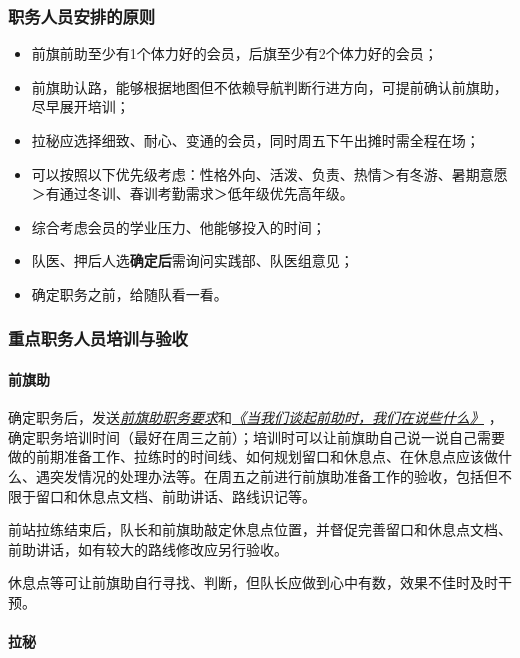 \documentclass[UTF8]{ctexart}
\begin{document}
\subsubsection{职务人员安排的原则}

\begin{itemize}[nosep,left=2em]
    \item 前旗前助至少有1个体力好的会员，后旗至少有2个体力好的会员；
    \item 前旗助认路，能够根据地图但不依赖导航判断行进方向，可提前确认前旗助，尽早展开培训；
    \item 拉秘应选择细致、耐心、变通的会员，同时周五下午出摊时需全程在场；
    \item 可以按照以下优先级考虑：性格外向、活泼、负责、热情＞有冬游、暑期意愿＞有通过冬训、春训考勤需求＞低年级优先高年级。
    \item 综合考虑会员的学业压力、他能够投入的时间；
    \item 队医、押后人选\textbf{确定后}需询问实践部、队医组意见；
    \item 确定职务之前，给随队看一看。    
\end{itemize}

\subsubsection{重点职务人员培训与验收}

\paragraph{前旗助}

确定职务后，发送\href{https://chexie.net/bbs/content/?bid=7&tid=1062&p=1#2}{\textit{前旗助职务要求}}和\href{https://www.chexie.net/bbs/content/?bid=7&tid=879&p=1}{\textit{《当我们谈起前助时，我们在说些什么》}}
，确定职务培训时间（最好在周三之前）；培训时可以让前旗助自己说一说自己需要做的前期准备工作、拉练时的时间线、如何规划留口和休息点、在休息点应该做什么、遇突发情况的处理办法等。在周五之前进行前旗助准备工作的验收，包括但不限于留口和休息点文档、前助讲话、路线识记等。

前站拉练结束后，队长和前旗助敲定休息点位置，并督促完善留口和休息点文档、前助讲话，如有较大的路线修改应另行验收。

休息点等可让前旗助自行寻找、判断，但队长应做到心中有数，效果不佳时及时干预。

\paragraph{拉秘}
\end{document}
